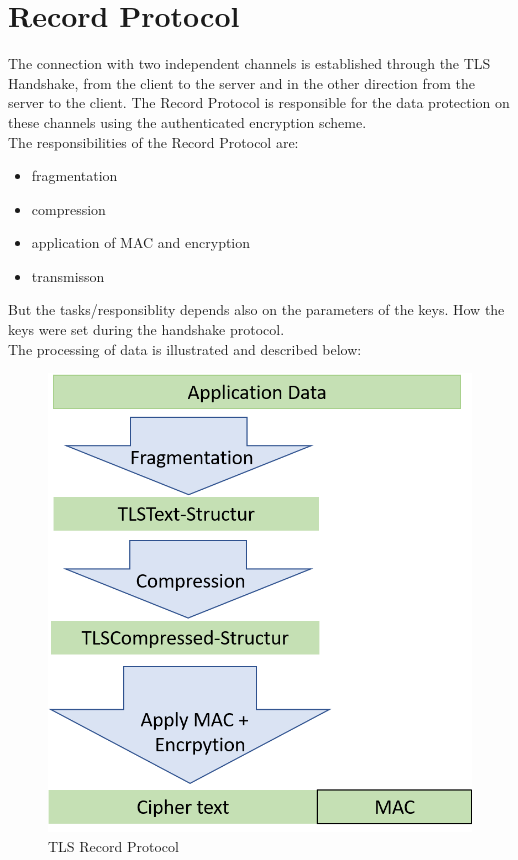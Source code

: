 \section{Record Protocol}
\label{sec:record_protocol}

The connection with two independent channels is established through the TLS Handshake, from the client to the server and in the other direction from the server to the client. The Record Protocol is responsible for the data protection on these channels using the authenticated encryption scheme.\\
The responsibilities of the Record Protocol are:
\begin{itemize}
	\item fragmentation
	\item compression
	\item application of MAC and encryption
	\item transmisson 
\end{itemize}
But the tasks/responsiblity depends also on the parameters of the keys. How the keys were set during the handshake protocol. \\

The processing of data is illustrated and described below:      

\begin{figure}[H]
	\centering
		\includegraphics[scale=0.5]{images/tls_recordprotocol.png}
	\caption{TLS Record Protocol}
	\label{fig:tls_recordprotocol}
\end{figure}

